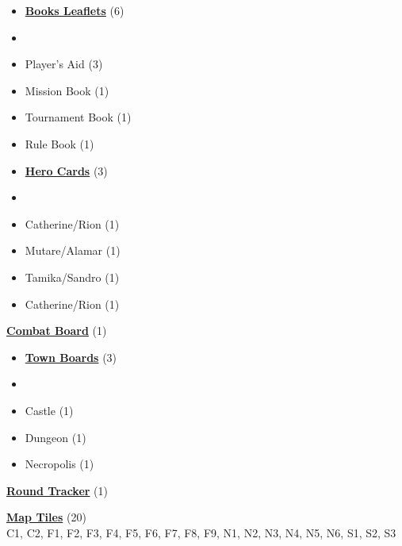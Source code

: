 

\begin{multicols*}{3}

\footnotesize

\begin{itemize}[leftmargin=0pt, label={}, noitemsep, noitemsep]
  \item \textbf{\small{\underline{Books Leaflets}}} (6)
  \item
  \item Player's Aid (3)
  \item Mission Book (1)
  \item Tournament Book (1)
  \item Rule Book (1)
\end{itemize}

\begin{itemize}[leftmargin=0pt, label={}, noitemsep, noitemsep]
  \item \textbf{\small{\underline{Hero Cards}}} (3)
  \item
  \item Catherine/Rion (1)
  \item Mutare/Alamar (1)
  \item Tamika/Sandro (1)
  \item Catherine/Rion (1)
\end{itemize}

\textbf{\small{\underline{Combat Board}}} (1)

\begin{itemize}[leftmargin=0pt, label={}, noitemsep, noitemsep]
  \item \textbf{\small{\underline{Town Boards}}} (3)
  \item
  \item Castle (1)
  \item Dungeon (1)
  \item Necropolis (1)
\end{itemize}

\textbf{\small{\underline{Round Tracker}}} (1)

\textbf{\small{\underline{Map Tiles}}} (20)\\

C1, C2, F1, F2, F3, F4, F5, F6, F7, F8, F9, N1, N2, N3, N4, N5, N6, S1, S2, S3


\end{multicols*}
